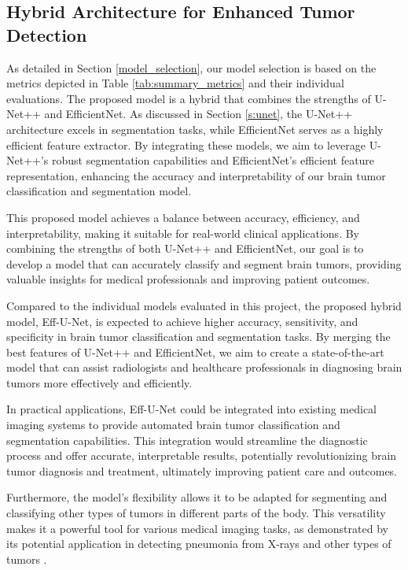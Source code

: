 \subsection{Hybrid Architecture for Enhanced Tumor Detection}\label{Hybrid_Model}

As detailed in Section \ref{model_selection}, our model selection is based on the metrics depicted in Table \ref{tab:summary_metrics} and their individual evaluations. The proposed model is a hybrid that combines the strengths of U-Net++ and EfficientNet. As discussed in Section \ref{s:unet}, the U-Net++ architecture excels in segmentation tasks, while EfficientNet serves as a highly efficient feature extractor. By integrating these models, we aim to leverage U-Net++'s robust segmentation capabilities and EfficientNet's efficient feature representation, enhancing the accuracy and interpretability of our brain tumor classification and segmentation model.

This proposed model achieves a balance between accuracy, efficiency, and interpretability, making it suitable for real-world clinical applications. By combining the strengths of both U-Net++ and EfficientNet, our goal is to develop a model that can accurately classify and segment brain tumors, providing valuable insights for medical professionals and improving patient outcomes.

Compared to the individual models evaluated in this project, the proposed hybrid model, Eff-U-Net, is expected to achieve higher accuracy, sensitivity, and specificity in brain tumor classification and segmentation tasks. By merging the best features of U-Net++ and EfficientNet, we aim to create a state-of-the-art model that can assist radiologists and healthcare professionals in diagnosing brain tumors more effectively and efficiently.

In practical applications, Eff-U-Net could be integrated into existing medical imaging systems to provide automated brain tumor classification and segmentation capabilities. This integration would streamline the diagnostic process and offer accurate, interpretable results, potentially revolutionizing brain tumor diagnosis and treatment, ultimately improving patient care and outcomes.

Furthermore, the model's flexibility allows it to be adapted for segmenting and classifying other types of tumors in different parts of the body. This versatility makes it a powerful tool for various medical imaging tasks, as demonstrated by its potential application in detecting pneumonia from X-rays and other types of tumors \cite{yu_pneumonia_2021, lin_brain_2024}.


